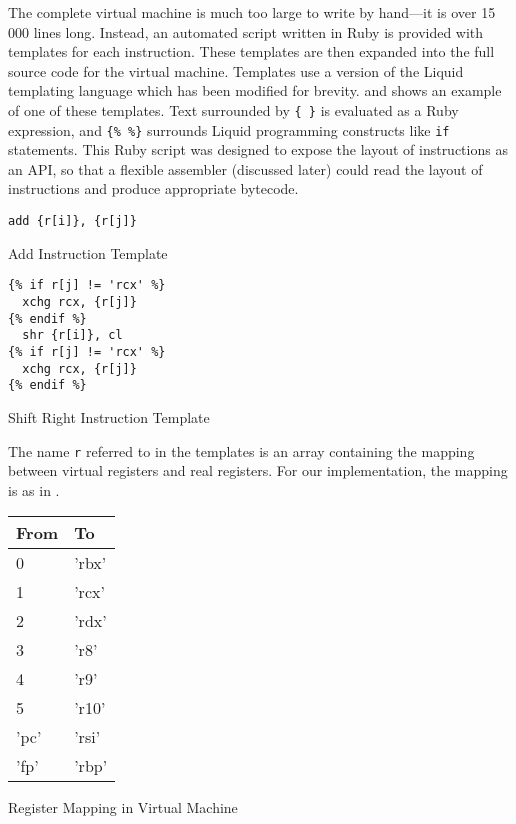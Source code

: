 		The complete virtual machine is much too large to write by hand---it is over 15 000 lines long. Instead, an automated script written in Ruby is provided with templates for each instruction. These templates are then expanded into the full source code for the virtual machine. Templates use a version of the Liquid templating language which has been modified for brevity.  and  shows an example of one of these templates. Text surrounded by \texttt{\{ \}} is evaluated as a Ruby expression, and \texttt{\{\% \%\}} surrounds Liquid programming constructs like \texttt{if} statements. This Ruby script was designed to expose the layout of instructions as an API, so that a flexible assembler (discussed later) could read the layout of instructions and produce appropriate bytecode.
		
		\begin{doublefig}
			\begin{halffig}
				\begin{lstlisting}
add {r[i]}, {r[j]}
				\end{lstlisting}
				\caption{Add Instruction Template}
				\label{fig:addtemplate}
			\end{halffig}
			\begin{halffig}
				\begin{lstlisting}
{% if r[j] != 'rcx' %}
  xchg rcx, {r[j]}
{% endif %}
  shr {r[i]}, cl
{% if r[j] != 'rcx' %}
  xchg rcx, {r[j]}
{% endif %}
				\end{lstlisting}
				\caption{Shift Right Instruction Template}
				\label{fig:shrtemplate}
			\end{halffig}
		\end{doublefig}
		
		The name \texttt{r} referred to in the templates is an array containing the mapping between virtual registers and real registers. For our implementation, the mapping is as in .
		
		\begin{myfigure}
			\begin{tabular}{|l|l|}
				\hline
				From & To \\
				\hline
				0 & 'rbx' \\
				\hline
				1 & 'rcx' \\
				\hline
				2 & 'rdx' \\
				\hline
				3 & 'r8' \\
				\hline
				4 & 'r9' \\
				\hline
				5 & 'r10' \\
				\hline
				'pc' & 'rsi' \\
				\hline
				'fp' & 'rbp' \\ 
				\hline
			\end{tabular}
			\caption{Register Mapping in Virtual Machine}
			\label{fig:regmap}
		\end{myfigure}
		
